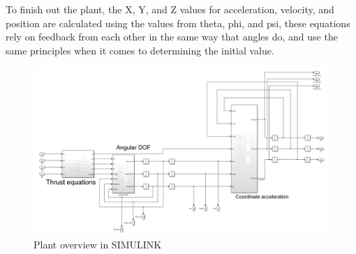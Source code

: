 To finish out the plant, the X, Y, and Z values for acceleration, velocity, and position are calculated using the values from theta, phi, and psi, these equations rely on feedback from each other in the same way that angles do, and use the same principles when it comes to determining the initial value. 

\begin{figure}[H]
   \includegraphics[scale =0.6]{pictures/control/Plant overview.png}
\caption{Plant overview in SIMULINK}
\end{figure}
